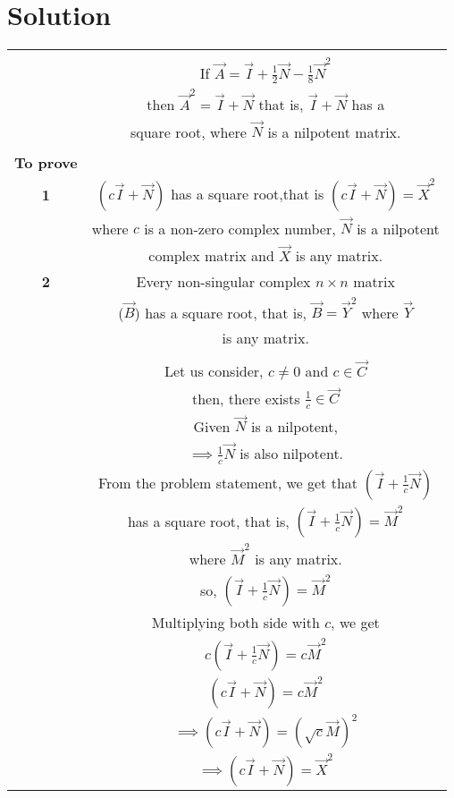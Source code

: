 \documentclass[journal,12pt,onecolumn]{IEEEtran}
\begin{document}
\section{Solution} 
\begin{longtable}{|c|c|}
\hline
\multirow{3}{*}{} & \\
\textbf{Given} & If $\vec{A}=\vec{I}+\frac{1}{2}\vec{N}-\frac{1}{8}\vec{N}^2$\\
& then $\vec{A}^2 = \vec{I}+\vec{N}$ that is, $\vec{I}+\vec{N}$ has a \\
& square root, where $\vec{N}$ is a nilpotent matrix.\\
& \\
\hline
\textbf{To prove} & \\
\hline
\textbf{1} & $(c\vec{I}+\vec{N})$ has a square root,that is $(c\vec{I}+\vec{N})= \vec{X}^2$\\
& where $c$ is a non-zero complex number, $\vec{N}$ is a nilpotent\\
&  complex matrix and $\vec{X}$ is any matrix.\\
\hline
\textbf{2} & Every non-singular complex $n \times n$ matrix \\
& ($\vec{B}$) has a square root, that is, $\vec{B} = \vec{Y}^2$ where $\vec{Y}$\\
&  is any matrix.\\
\hline
\multirow{3}{*}{} & \\
\textbf{Proof 1} & Let us consider, $c \neq 0$ and $c \in \vec{C}$\\
& then, there exists $\frac{1}{c} \in \vec{C}$\\
& Given $\vec{N}$ is a nilpotent, \\
& $\implies \frac{1}{c}\vec{N}$ is also nilpotent.\\
& From the problem statement, we get that $(\vec{I}+\frac{1}{c}\vec{N})$\\
& has a square root, that is, $(\vec{I}+\frac{1}{c}\vec{N}) = \vec{M}^2$\\
& where $\vec{M}^2$ is any matrix.\\
& so, $(\vec{I}+\frac{1}{c}\vec{N}) = \vec{M}^2$\\
& Multiplying both side with $c$, we get\\
& $c(\vec{I}+\frac{1}{c}\vec{N}) = c\vec{M}^2$\\
& $(c\vec{I}+\vec{N}) = c\vec{M}^2$\\
& $\implies (c\vec{I}+\vec{N}) = (\sqrt{c}\vec{M})^2$\\
& $\implies (c\vec{I}+\vec{N}) = \vec{X}^2$\\

\end{longtable}
\end{document}
